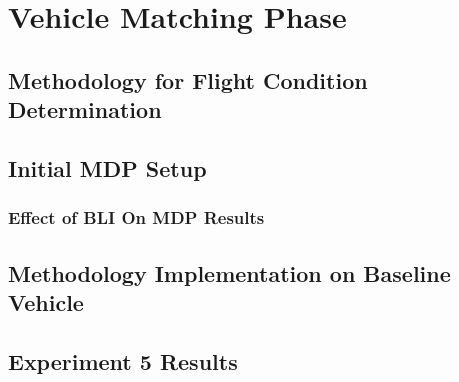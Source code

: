 \chapter{Vehicle Matching Phase}
\section{Methodology for Flight Condition Determination}
\section{Initial MDP Setup}
\subsection{Effect of BLI On MDP Results}
\section{Methodology Implementation on Baseline Vehicle}
\section{Experiment 5 Results}